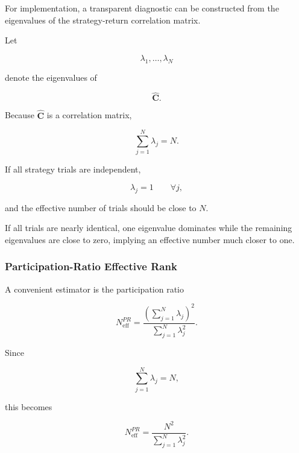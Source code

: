 \documentclass[11pt,a4paper]{article}
\begin{document}
For implementation, a transparent diagnostic can be constructed from the
eigenvalues of the strategy-return correlation matrix.

Let

\begin{equation}
\lambda_1,\ldots,\lambda_N
\end{equation}

denote the eigenvalues of

\begin{equation}
\widehat{\mathbf{C}}.
\end{equation}

Because $\widehat{\mathbf{C}}$ is a correlation matrix,

\begin{equation}
\sum_{j=1}^{N}\lambda_j
=
N.
\end{equation}

If all strategy trials are independent,

\begin{equation}
\lambda_j=1
\qquad
\forall j,
\end{equation}

and the effective number of trials should be close to $N$.

If all trials are nearly identical, one eigenvalue dominates while the
remaining eigenvalues are close to zero, implying an effective number much
closer to one.


\subsubsection{Participation-Ratio Effective Rank}

A convenient estimator is the participation ratio

\begin{equation}
\boxed{
N_{\mathrm{eff}}^{PR}
=
\frac{
\left(
\sum_{j=1}^{N}\lambda_j
\right)^2
}{
\sum_{j=1}^{N}\lambda_j^2
}.
}
\end{equation}

Since

\begin{equation}
\sum_{j=1}^{N}\lambda_j=N,
\end{equation}

this becomes

\begin{equation}
\boxed{
N_{\mathrm{eff}}^{PR}
=
\frac{
N^2
}{
\sum_{j=1}^{N}\lambda_j^2
}.
}
\end{equation}
\end{document}
